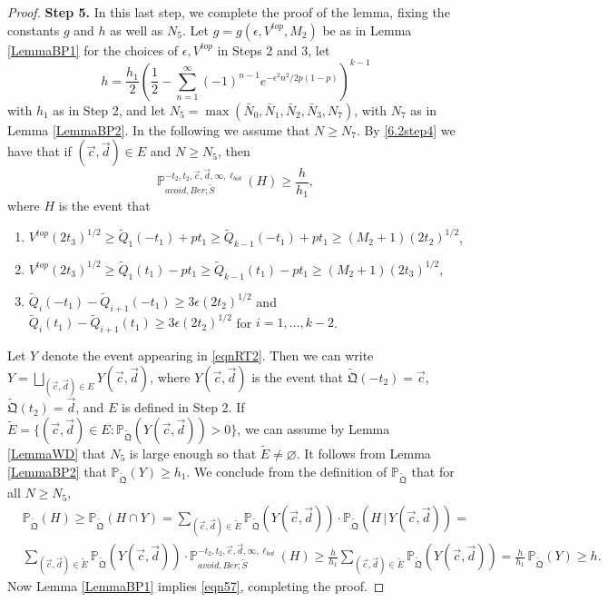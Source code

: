 \begin{proof}
	{\bf \raggedleft Step 5.} In this last step, we complete the proof of the lemma, fixing the constants $g$ and $h$ as well as $N_5$. Let $g=g(\epsilon,V^{top},M_2)$ be as in Lemma \ref{LemmaBP1} for the choices of $\epsilon,V^{top}$ in Steps 2 and 3, let
	\[
	h = \frac{h_1}{2}\left(\frac{1}{2} - \sum_{n=1}^\infty (-1)^{n-1} e^{-\epsilon^2 n^2/2p(1-p)}\right)^{k-1}
	\]
	with $h_1$ as in Step 2, and let $N_5 = \max(\bar{N}_0,\bar{N}_1,\bar{N}_2,\bar{N}_3,N_7)$, with $N_7$ as in Lemma \ref{LemmaBP2}. In the following we assume that $N\geq N_7$. By \eqref{6.2step4} we have that if $(\vec{c},\vec{d})\in E$ and $N\geq N_5$, then
	$$\mathbb{P}_{avoid, Ber;\tilde{S}}^{-t_2, t_2, \vec{c}, \vec{d}, \infty, \ell_{bot}} ( H) \geq \frac{h}{h_1},$$
	where $H$ is the event that
	
	\begin{enumerate}
		\item $V^{top} (2t_3)^{1/2} \geq \tilde Q_1(-t_1) + p t_1 \geq \tilde Q_{k-1}(-t_1) + pt_1 \geq (M_2 + 1) (2t_2)^{1/2}$,
		\item $V^{top} (2t_3)^{1/2} \geq \tilde Q_1(t_1) - p t_1 \geq \tilde Q_{k-1}(t_1) - pt_1 \geq (M_2 + 1) (2t_3)^{1/2}$,
		\item $\tilde Q_i(-t_1) - \tilde Q_{i+1}(-t_1) \geq 3\epsilon (2t_2)^{1/2}$ and $\tilde Q_i(t_1) - \tilde Q_{i+1}(t_1)  \geq 3 \epsilon (2t_2)^{1/2}$ for $i = 1, \dots, k-2$.
	\end{enumerate}
	Let $Y$ denote the event appearing in \eqref{eqnRT2}. Then we can write $Y = \bigsqcup_{(\vec{c},\vec{d})\in E} Y(\vec{c},\vec{d})$, where $Y(\vec{c},\vec{d})$ is the event that $\tilde{\mathfrak{Q}}(-t_2) = \vec{c}$, $\tilde{\mathfrak{Q}}(t_2) = \vec{d}$, and $E$ is defined in Step 2. If $\tilde{E} = \{(\vec{c},\vec{d})\in E : \mathbb{P}_{\tilde{\mathfrak{Q}}}(Y(\vec{c},\vec{d})) > 0\}$, we can assume by Lemma \ref{LemmaWD} that $N_5$ is large enough so that $\tilde{E}\neq\varnothing$. It follows from Lemma \ref{LemmaBP2} that $\mathbb{P}_{\tilde{\mathfrak Q}}(Y) \geq h_1$. We conclude from the definition of $\mathbb{P}_{\tilde{\mathfrak{Q}}}$ that for all $N\geq N_5$,
	\begin{align*}
	&\mathbb{P}_{\tilde{\mathfrak{Q}}}(H) \geq \mathbb{P}_{\tilde{\mathfrak{Q}}}(H\cap Y) = \sum_{(\vec{c},\vec{d})\in \tilde E} \mathbb{P}_{\tilde{\mathfrak{Q}}}(Y(\vec{c},\vec{d}))\cdot \mathbb{P}_{\tilde{\mathfrak{Q}}}(H\,|\,Y(\vec{c},\vec{d})) =\\
	&\sum_{(\vec{c},\vec{d})\in \tilde E} \mathbb{P}_{\tilde{\mathfrak{Q}}}(Y(\vec{c},\vec{d}))\cdot \mathbb{P}^{-t_2,t_2,\vec{c},\vec{d},\infty,\ell_{bot}}_{avoid,Ber;\tilde S}(H) \geq \frac{h}{h_1}\sum_{(\vec{c},\vec{d})\in \tilde E} \mathbb{P}_{\tilde{\mathfrak{Q}}}(Y(\vec{c},\vec{d})) = \frac{h}{h_1}\,\mathbb{P}_{\tilde{\mathfrak{Q}}}(Y) \geq h.
	\end{align*}
	Now Lemma \ref{LemmaBP1} implies \eqref{eqn57}, completing the proof.
\end{proof}